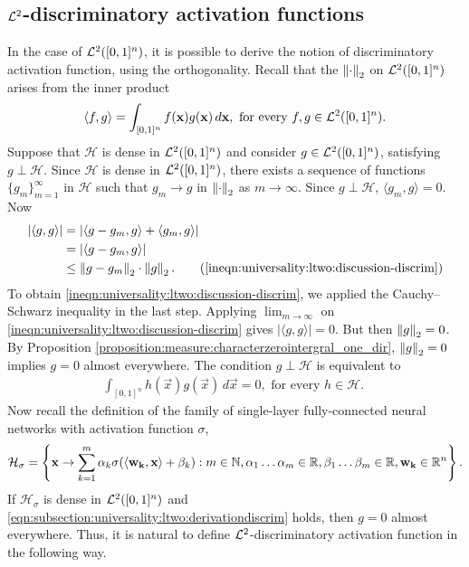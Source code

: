 \subsection{${\mathcal {L}^2}$-discriminatory activation functions}
\label{subsection:universality:ltwo:1}
In the case of ${\mathcal {L}^2}([0,1]^n)$, it is possible to derive the notion of discriminatory activation function, using the orthogonality. Recall that the $\left\lVert\cdot\right\rVert_2$ on ${\mathcal {L}^2}([0,1]^n)$ arises from the inner product \[ 
    \langle f, g \rangle = \int_{[0,1]^n} f(\mathbf{x})g(\mathbf{x}) \, d\mathbf{x}, \text{ for every $f, g \in {\mathcal {L}^2}([0,1]^n)$}.
\]
Suppose that $\mathcal{H}$ is dense in ${\mathcal {L}^2}([0,1]^n)$ and consider $g \in {\mathcal {L}^2}([0,1]^n)$, satisfying $g \perp \mathcal{H}$. Since $\mathcal{H}$ is dense in ${\mathcal {L}^2}([0,1]^n)$, there exists a sequence of functions $\{ g_m \}_{m=1}^\infty$ in $\mathcal{H}$ such that $g_m \to g$ in $\left\lVert\cdot\right\rVert_2$ as $m \to \infty$. Since $g \perp \mathcal{H}$, $\langle g_m, g \rangle = 0$. Now
\begin{subequations}\label{ineqn:universality:ltwo:discussion-discrim}
\begin{align*}
    | \langle g, g \rangle | &= | \langle g - g_m, g \rangle + \langle g_m, g \rangle | \\
                             &= | \langle g - g_m, g \rangle | \\
                             &\leq \norm{g - g_m}_2 \cdot \norm{g}_2.
     \tag{\ref{ineqn:universality:ltwo:discussion-discrim}} 
\end{align*}
\end{subequations}
To obtain \ref{ineqn:universality:ltwo:discussion-discrim}, we applied the Cauchy–Schwarz inequality in the last step.
\newpage
Applying $\lim_{m \to \infty}$ on \ref{ineqn:universality:ltwo:discussion-discrim} gives $ | \langle g, g \rangle | = 0$. But then $\left\lVert g\right\rVert_2 = 0$. By Proposition \ref{proposition:measure:characterzerointergral_one_dir}, $\left\lVert g\right\rVert_2 = 0$ implies $g = 0$ almost everywhere. The condition $g \perp \mathcal{H}$ is equivalent to \begin{align}
    \label{eqn:subsection:universality:ltwo:derivationdiscrim}
    \int_{[0,1]^n} h(\vec{x}) g(\vec{x}) \, d\vec{x} = 0, \text{ for every $h \in \mathcal{H}$. } 
\end{align}
Now recall the definition of the family of single-layer fully-connected neural networks with activation function $\sigma$, \begin{align*}
\mathcal{H}_{\sigma} = \left \{ \mathbf{x} \to \sum_{k=1}^{m} \alpha_k \sigma{\left (\langle \mathbf{w_k}, \mathbf{x} \rangle + \beta_k \right)} : m \in {\mathbb N}, \alpha_1 \ldots \alpha_m \in {\mathbb R},  \beta_1 \ldots \beta_m \in {\mathbb R}, \mathbf{w_k} \in {\mathbb R}^n \right \}.
\end{align*}
If $\mathcal{H}_{\sigma}$ is dense in ${\mathcal {L}^2}([0,1]^n)$ and \ref{eqn:subsection:universality:ltwo:derivationdiscrim} holds, then $g = 0$ almost everywhere. Thus, it is natural to define ${\mathcal {L}^2}$-discriminatory activation function in the following way.

